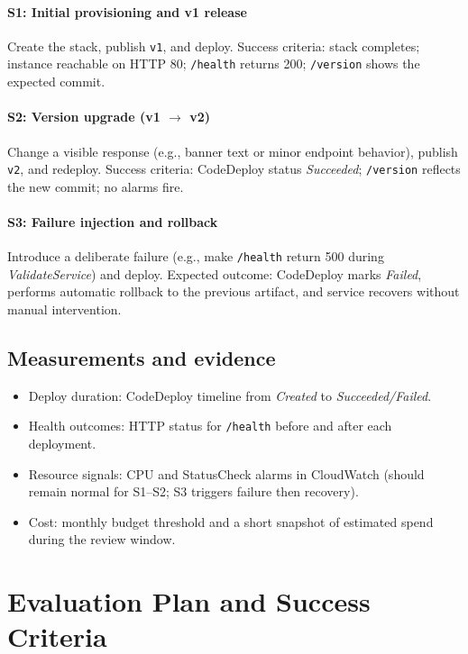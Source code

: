 \documentclass[12pt]{article}
\begin{document}
\paragraph{S1: Initial provisioning and v1 release}
Create the stack, publish \texttt{v1}, and deploy. Success criteria: stack completes; instance reachable on HTTP 80; \texttt{/health} returns 200; \texttt{/version} shows the expected commit.

\paragraph{S2: Version upgrade (v1 $\rightarrow$ v2)}
Change a visible response (e.g., banner text or minor endpoint behavior), publish \texttt{v2}, and redeploy. Success criteria: CodeDeploy status \emph{Succeeded}; \texttt{/version} reflects the new commit; no alarms fire.

\paragraph{S3: Failure injection and rollback}
Introduce a deliberate failure (e.g., make \texttt{/health} return 500 during \emph{ValidateService}) and deploy. Expected outcome: CodeDeploy marks \emph{Failed}, performs automatic rollback to the previous artifact, and service recovers without manual intervention.

\subsection{Measurements and evidence}
\begin{itemize}
\item Deploy duration: CodeDeploy timeline from \emph{Created} to \emph{Succeeded/Failed}.
\item Health outcomes: HTTP status for \texttt{/health} before and after each deployment.
\item Resource signals: CPU and StatusCheck alarms in CloudWatch (should remain normal for S1--S2; S3 triggers failure then recovery).
\item Cost: monthly budget threshold and a short snapshot of estimated spend during the review window.
\end{itemize}

\section{Evaluation Plan and Success Criteria}\label{sec:evaluation}
\end{document}
